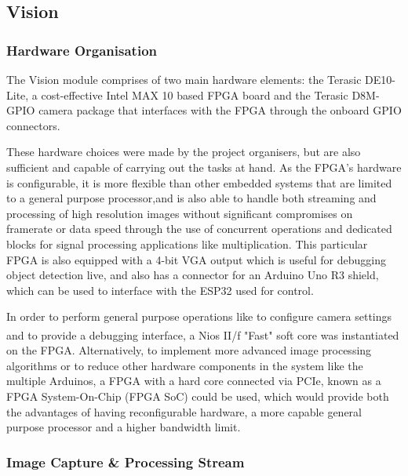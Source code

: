 \documentclass[a4paper]{article}
\begin{document}
\subsection{Vision}


\subsubsection{Hardware Organisation}

The Vision module comprises of two main hardware elements: 
    the Terasic DE10-Lite, a cost-effective Intel MAX 10 based FPGA board 
    \cite{TerasicDE10Web} 
    and the Terasic D8M-GPIO camera package \cite{TerasicD8MWeb}
that interfaces with the FPGA through the onboard GPIO connectors. 

These hardware choices were made by the project organisers, 
but are also sufficient and capable of carrying out the tasks at hand. 
As the FPGA's hardware is configurable, 
it is more flexible than other embedded systems 
that are limited to a general purpose processor,and 
is also able to handle both streaming and processing of high resolution images
without significant compromises on framerate or data speed 
through the use of concurrent operations and dedicated blocks 
for signal processing applications like multiplication.
This particular FPGA is also equipped with a 4-bit VGA output 
which is useful for debugging object detection live, 
and also has a connector for an Arduino Uno R3 shield, \cite{TerasicDE10Web} 
which can be used to interface with the ESP32 used for control.  

In order to perform general purpose operations like
    to configure camera settings
    and to provide a debugging interface,
a Nios\textsuperscript{\textregistered} II/f "Fast" soft core was instantiated on the FPGA. 
Alternatively, to implement more advanced image processing algorithms
or to reduce other hardware components in the system like the multiple Arduinos, 
a FPGA with a hard core connected via PCIe, 
known as a FPGA System-On-Chip (FPGA SoC) \cite{FPGASoC} could be used, 
which would provide both the advantages of having reconfigurable hardware,
a more capable general purpose processor and a higher bandwidth limit. 

\subsubsection{Image Capture \& Processing Stream}
\end{document}
